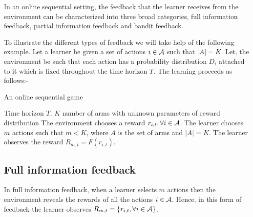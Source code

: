 In an online sequential setting, the feedback that the learner receives from the environment can be characterized into three broad categories, full information feedback, partial information feedback and bandit feedback. 


	To illustrate the different types of feedback we will take help of the following example. Let a learner be given a set of actions $i\in\mathcal{A}$ such that $|A|=K$. Let, the environment be such that each action has a probability distribution $D_i$ attached to it which is fixed throughout the time horizon $T$. The learning proceeds as follows:-

\begin{algorithm}[!th]
\caption{An online sequential game}
\label{alg:OSeqGame}
\begin{algorithmic}
 Time horizon $T$, $K$ number of arms with unknown parameters of reward distribution
\State {}
\State The environment chooses a reward $r_{i,t},\forall i\in\mathcal{A}$.
\State The learner chooses $m$ actions such that $m < K$, where $A$ is the set of arms and $|A|=K$.
\State The learner observes the reward $R_{m,t}=F\left( r_{i,t}\right)$.
\State \EndFor
\end{algorithmic}
\end{algorithm}



\subsection{Full information feedback}
In full information feedback, when a learner selects $m$ actions then the environment reveals the rewards of all the actions $i\in \mathcal{A}$. Hence, in this form of feedback  the learner observes $R_{m,t} = \lbrace r_{i,t},\forall i\in\mathcal{A}\rbrace$.


